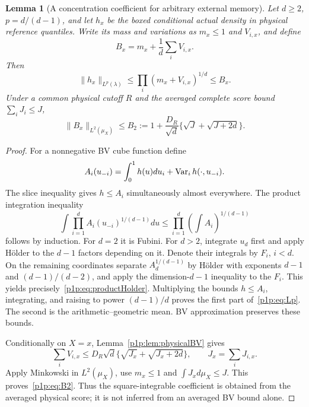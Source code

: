 \documentclass[11pt]{article}
\numberwithin{equation}{section}
\newtheorem{lemma}[theorem]{Lemma}
\theoremstyle{definition}
\theoremstyle{remark}
\begin{document}
\begin{lemma}[A concentration coefficient for arbitrary external memory]
\label{p1p:lem:concentration}
Let $d\geq2$, $p=d/(d-1)$, and let $h_x$ be the boxed conditional actual
density in physical reference quantiles. Write its mass and variations
as $m_x\leq1$ and $V_{i,x}$, and define
\begin{equation}\label{p1p:eq:Bcoefficient}
 B_x=m_x+\frac1d\sum_i V_{i,x}.
\end{equation}
Then
\begin{equation}\label{p1p:eq:Lp}
 \|h_x\|_{L^p(\lambda)}\leq
 \prod_i(m_x+V_{i,x})^{1/d}\leq B_x.
\end{equation}
Under a common physical cutoff $R$ and the averaged complete score bound
$\sum_iJ_i\leq J$,
\begin{equation}\label{p1p:eq:B2}
 \|B_x\|_{L^2(\mu_X)}\leq
 B_2:=1+\frac{D_R}{\sqrt d}\{\sqrt J+\sqrt{J+2d}\}.
\end{equation}
\end{lemma}
\begin{proof}
For a nonnegative BV cube function define
\[
 A_i(u_{-i})=\int_0^1h(u)du_i+\operatorname{Var}_i h(\cdot,u_{-i}).
\]
The slice inequality gives $h\leq A_i$ simultaneously almost everywhere.
The product integration inequality
\begin{equation}\label{p1p:eq:productHolder}
 \int\prod_{i=1}^d A_i(u_{-i})^{1/(d-1)}du
 \leq\prod_{i=1}^d\left(\int A_i\right)^{1/(d-1)}
\end{equation}
follows by induction. For $d=2$ it is Fubini. For $d>2$, integrate $u_d$
first and apply H\"older to the $d-1$ factors depending on it. Denote their
integrals by $F_i$, $i<d$. On the remaining coordinates separate
$A_d^{1/(d-1)}$ by H\"older with exponents $d-1$ and
$(d-1)/(d-2)$, and apply the dimension-$d-1$ inequality to the $F_i$.
This yields precisely~\eqref{p1p:eq:productHolder}.
Multiplying the bounds $h\leq A_i$, integrating, and raising to power
$(d-1)/d$ proves the first part of~\eqref{p1p:eq:Lp}. The second is the
arithmetic--geometric mean. BV approximation preserves these bounds.

Conditionally on $X=x$, Lemma~\ref{p1p:lem:physicalBV} gives
\[
 \sum_iV_{i,x}\leq D_R\sqrt d
 \{\sqrt{J_x}+\sqrt{J_x+2d}\},\qquad J_x=\sum_iJ_{i,x}.
\]
Apply Minkowski in $L^2(\mu_X)$, use $m_x\leq1$ and
$\int J_xd\mu_X\leq J$. This proves~\eqref{p1p:eq:B2}.
Thus the square-integrable coefficient is obtained from the averaged
physical score; it is not inferred from an averaged BV bound alone.
\end{proof}
\end{document}
